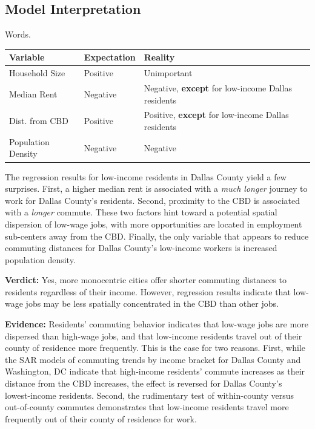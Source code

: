 \documentclass[paper=letter, fontsize=12pt]{scrartcl} %
\begin{document}
\subsection{Model Interpretation}
Words.
\begin{center}
	\begin{tabular}{|| p{1.2in} | p{1in} | p{3in} ||}
		\hline
		\textbf{Variable} & \textbf{Expectation} & \textbf{Reality}\\
		\hline\hline
		Household Size & Positive & Unimportant\\
		\hline
		Median Rent & Negative & Negative, \textbf{except} for low-income Dallas residents\\
		\hline
		Dist. from CBD & Positive & Positive, \textbf{except} for low-income Dallas residents\\
		\hline
		Population Density & Negative & Negative\\
		\hline
	\end{tabular}
\end{center}
The regression results for low-income residents in Dallas County yield a few surprises. First, a higher median rent is associated with a \textit{much longer} journey to work for Dallas County's residents. Second, proximity to the CBD is associated with a \textit{longer} commute. These two factors hint toward a potential spatial dispersion of low-wage jobs, with more opportunities are located in employment sub-centers away from the CBD. Finally, the only variable that appears to reduce commuting distances for Dallas County's low-income workers is increased population density.

\textbf{Verdict:} Yes, more monocentric cities offer shorter commuting distances to residents regardless of their income. However, regression results indicate that low-wage jobs may be less spatially concentrated in the CBD than other jobs.\par

\textbf{Evidence:} Residents' commuting behavior indicates that low-wage jobs are more dispersed than high-wage jobs, and that low-income residents travel out of their county of residence more frequently. This is the case for two reasons. First, while the SAR models of commuting trends by income bracket for Dallas County and Washington, DC indicate that high-income residents' commute increases as their distance from the CBD increases, the effect is reversed for Dallas County's lowest-income residents. Second, the rudimentary test of within-county versus out-of-county commutes demonstrates that low-income residents travel more frequently out of their county of residence for work.\par
\end{document}
